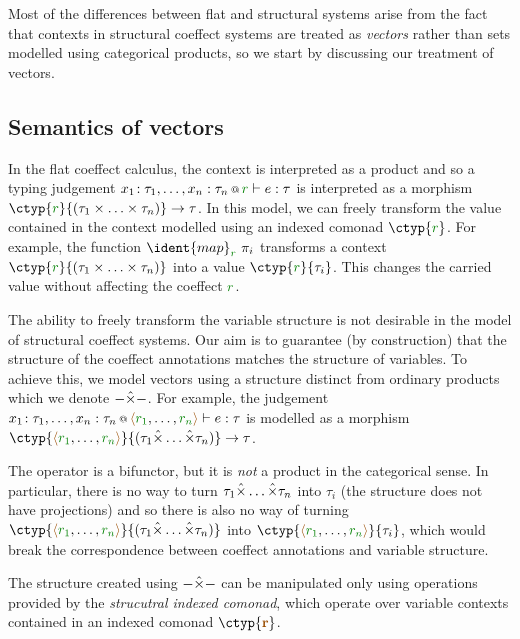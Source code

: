Most of the differences between flat and structural systems arise from the fact that contexts
in structural coeffect systems are treated as \emph{vectors} rather than sets modelled using 
categorical products, so we start by discussing our treatment of vectors.


\subsection{Semantics of vectors}

In the flat coeffect calculus, the context is interpreted as a product and so a typing judgement
$\coctx{x_1\!:\tau_1, \ldots, x_n:\tau_n}{\cclrd{r}} \vdash e : \tau$ is interpreted as a morphism 
$\ctyp{\cclrd{r}}{(\tau_1 \times \ldots \times \tau_n)} \rightarrow \tau$. In this model, we can 
freely transform the value contained in the context modelled using an indexed comonad
$\ctyp{\cclrd{r}}$. For example, the function $\ident{map}_{\cclrd{r}}~\pi_i$ transforms
a context $\ctyp{\cclrd{r}}{(\tau_1 \times \ldots \times \tau_n)}$ into a value 
$\ctyp{\cclrd{r}}{\tau_i}$. This changes the carried value without affecting the coeffect $\cclrd{r}$.

The ability to freely transform the variable structure is not desirable in the model of 
structural coeffect systems. Our aim is to guarantee (by construction) that the structure of
the coeffect annotations matches the structure of variables. To achieve this, we model vectors
using a structure distinct from ordinary products which we denote $-\hat{\times}-$. 
For example, the judgement $\coctx{x_1\!:\tau_1, \ldots, x_n:\tau_n}{\alift{\cclrd{r_1},\ldots,\cclrd{r_n}}} \vdash e : \tau$
is modelled as a morphism $\ctyp{\alift{\cclrd{r_1},\ldots,\cclrd{r_n}}}{(\tau_1 \xtimes \ldots \xtimes \tau_n)} \rightarrow \tau$.

The operator is a bifunctor, but it is \emph{not} a product in the categorical sense. In particular, 
there is no way to turn $\tau_1 \hat{\times} \ldots \hat{\times} \tau_n$ into $\tau_i$ (the structure does 
not have projections) and so there is also no way of turning
$\ctyp{\alift{\cclrd{r_1},\ldots,\cclrd{r_n}}}{(\tau_1 \xtimes \ldots \xtimes \tau_n)}$ into
$\ctyp{\alift{\cclrd{r_1},\ldots,\cclrd{r_n}}}{\tau_i}$, which would break the correspondence 
between coeffect annotations and variable structure.

The structure created using $-\hat{\times}-$ can be manipulated only using operations provided by
the \emph{strucutral indexed comonad}, which operate over variable contexts contained in an 
indexed comonad $\ctyp{\aclrd{\textbf{r}}}$.

